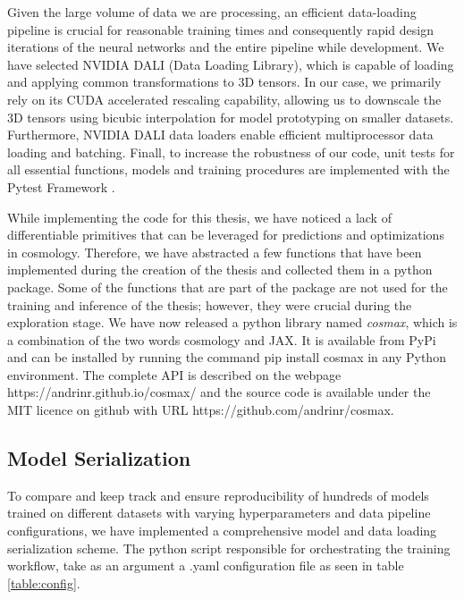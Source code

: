 \documentclass{article}
\begin{document}
Given the large volume of data we are processing, an efficient data-loading pipeline is crucial for reasonable training times and consequently rapid design iterations of the neural networks and the entire pipeline while development. We have selected NVIDIA DALI (Data Loading Library), which is capable of loading and applying common transformations to 3D tensors. In our case, we primarily rely on its CUDA accelerated rescaling capability, allowing us to downscale the 3D tensors using bicubic interpolation for model prototyping on smaller datasets. Furthermore, NVIDIA DALI data loaders enable efficient multiprocessor data loading and batching. Finall, to increase the robustness of our code, unit tests for all essential functions, models and training procedures are implemented with the Pytest Framework \citep{pytestx.y}.

While implementing the code for this thesis, we have noticed a lack of differentiable primitives that can be leveraged for predictions and optimizations in cosmology. Therefore, we have abstracted a few functions that have been implemented during the creation of the thesis and collected them in a python package. Some of the functions that are part of the package are not used for the training and inference of the thesis; however, they were crucial during the exploration stage. We have now released a python library named \textit{cosmax}, which is a combination of the two words cosmology and {JAX}. It is available from {PyPi} and can be installed by running the command {pip install cosmax} in any Python environment. The complete API is described on the webpage https://andrinr.github.io/cosmax/ and the source code is available under the MIT licence on github with URL https://github.com/andrinr/cosmax. 

\subsection{Model Serialization}

To compare and keep track and ensure reproducibility of hundreds of models trained on different datasets with varying hyperparameters and data pipeline configurations, we have implemented a comprehensive model and data loading serialization scheme. The python script responsible for orchestrating the training workflow, take as an argument a .yaml configuration file as seen in table \ref{table:config}.
\end{document}
